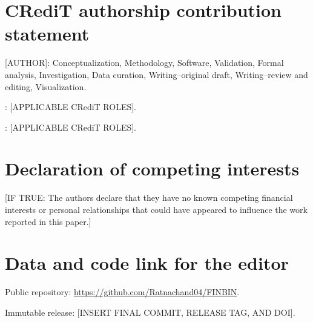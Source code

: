 \documentclass[preprint,12pt,authoryear]{elsarticle}
\begin{document}
\section*{CRediT authorship contribution statement}

[AUTHOR]: Conceptualization, Methodology, Software, Validation, Formal analysis,
Investigation, Data curation, Writing--original draft, Writing--review and
editing, Visualization.\par
[AUTHOR]: [APPLICABLE CRediT ROLES].\par
[AUTHOR]: [APPLICABLE CRediT ROLES].

\section*{Declaration of competing interests}

[IF TRUE: The authors declare that they have no known competing financial
interests or personal relationships that could have appeared to influence the
work reported in this paper.]\par
[OTHERWISE: PROVIDE THE COMPLETE DECLARATION.]

\section*{Data and code link for the editor}

Public repository: \url{https://github.com/Ratnachand04/FINBIN}.\par
Immutable release: [INSERT FINAL COMMIT, RELEASE TAG, AND DOI].\par
[BEFORE SUBMISSION: ARCHIVE THE FINAL MANUSCRIPT ARTIFACTS, CODE, DATA, TESTS,
AND OUTPUTS; THEN REPLACE THE PLACEHOLDER ABOVE.]
\end{document}
